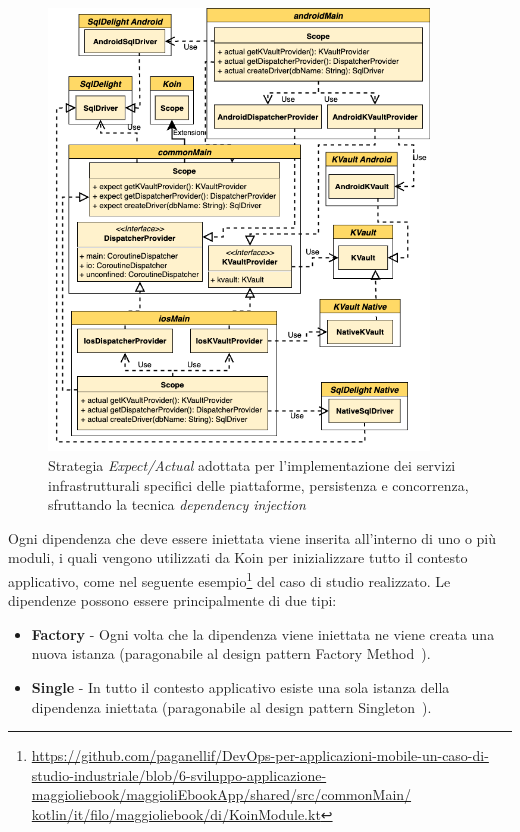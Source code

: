 \begin{figure}[H]
    \centering
    \includegraphics[width=0.9\textwidth]{img/expect-actual-shared.png}
    \caption{Strategia \textit{Expect/Actual} adottata per l'implementazione dei servizi infrastrutturali specifici delle piattaforme, persistenza e concorrenza, sfruttando la tecnica \textit{dependency injection}}
\end{figure}

Ogni dipendenza che deve essere iniettata viene inserita all'interno di uno o più moduli, i quali vengono utilizzati da Koin per inizializzare tutto il contesto applicativo, come nel seguente esempio\footnote{\href{https://github.com/paganellif/DevOps-per-applicazioni-mobile-un-caso-di-studio-industriale/blob/6-sviluppo-applicazione-maggioliebook/maggioliEbookApp/shared/src/commonMain/kotlin/it/filo/maggioliebook/di/KoinModule.kt}{https://github.com/paganellif/DevOps-per-applicazioni-mobile-un-caso-di-studio-industriale/blob/6-sviluppo-applicazione-maggioliebook/maggioliEbookApp/shared/src/commonMain/\\kotlin/it/filo/maggioliebook/di/KoinModule.kt}} del caso di studio realizzato. Le dipendenze possono essere principalmente di due tipi:

\begin{itemize}
    \item \textbf{Factory} - Ogni volta che la dipendenza viene iniettata ne viene creata una nuova istanza (paragonabile al design pattern Factory Method~\cite{gamma1994design}).
    \item \textbf{Single} - In tutto il contesto applicativo esiste una sola istanza della dipendenza iniettata (paragonabile al design pattern Singleton~\cite{gamma1994design}).
\end{itemize}

